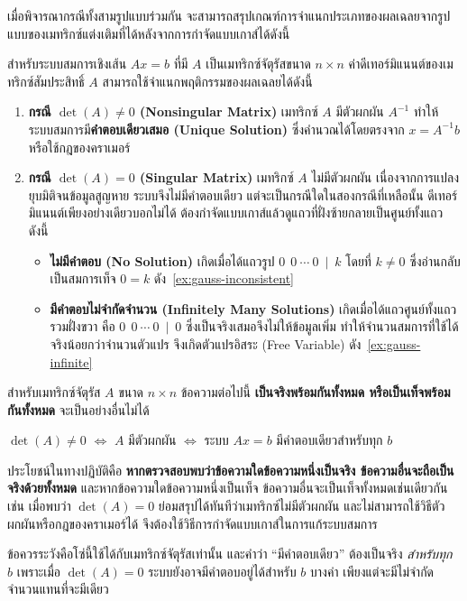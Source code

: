 เมื่อพิจารณากรณีทั้งสามรูปแบบร่วมกัน จะสามารถสรุปเกณฑ์การจำแนกประเภทของผลเฉลยจากรูปแบบของเมทริกซ์แต่งเติมที่ได้หลังจากการกำจัดแบบเกาส์ได้ดังนี้~\parencite{strang2023linear}

\begin{prop}
\label{prop:linear-system-solutions}
สำหรับระบบสมการเชิงเส้น $Ax = b$ ที่มี $A$ เป็นเมทริกซ์จัตุรัสขนาด $n \times n$ ค่าดีเทอร์มิแนนต์ของเมทริกซ์สัมประสิทธิ์ $A$ สามารถใช้จำแนกพฤติกรรมของผลเฉลยได้ดังนี้
\begin{enumerate}[label=\textbf{\arabic*.}]
    \item \textbf{กรณี $\det(A) \neq 0$ (Nonsingular Matrix)} เมทริกซ์ $A$ มีตัวผกผัน $A^{-1}$ ทำให้ระบบสมการมี\textbf{คำตอบเดียวเสมอ (Unique Solution)} ซึ่งคำนวณได้โดยตรงจาก $x = A^{-1}b$ หรือใช้กฎของคราเมอร์
    \item \textbf{กรณี $\det(A) = 0$ (Singular Matrix)} เมทริกซ์ $A$ ไม่มีตัวผกผัน เนื่องจากการแปลงยุบมิติจนข้อมูลสูญหาย ระบบจึงไม่มีคำตอบเดียว แต่จะเป็นกรณีใดในสองกรณีที่เหลือนั้น ดีเทอร์มิแนนต์เพียงอย่างเดียวบอกไม่ได้ ต้องกำจัดแบบเกาส์แล้วดูแถวที่ฝั่งซ้ายกลายเป็นศูนย์ทั้งแถว ดังนี้
    \begin{itemize}
        \item \textbf{ไม่มีคำตอบ (No Solution)} เกิดเมื่อได้แถวรูป $0\ \ 0\ \cdots\ 0\ \mid\ k$ โดยที่ $k \neq 0$ ซึ่งอ่านกลับเป็นสมการเท็จ $0 = k$ ดัง~\autoref{ex:gauss-inconsistent}
        \item \textbf{มีคำตอบไม่จำกัดจำนวน (Infinitely Many Solutions)} เกิดเมื่อได้แถวศูนย์ทั้งแถวรวมฝั่งขวา คือ $0\ \ 0\ \cdots\ 0\ \mid\ 0$ ซึ่งเป็นจริงเสมอจึงไม่ให้ข้อมูลเพิ่ม ทำให้จำนวนสมการที่ใช้ได้จริงน้อยกว่าจำนวนตัวแปร จึงเกิดตัวแปรอิสระ (Free Variable) ดัง~\autoref{ex:gauss-infinite}
    \end{itemize}
\end{enumerate}
\end{prop}

\begin{principle}
\label{prin:equivalence-chain}
สำหรับเมทริกซ์จัตุรัส $A$ ขนาด $n \times n$ ข้อความต่อไปนี้ \textbf{เป็นจริงพร้อมกันทั้งหมด หรือเป็นเท็จพร้อมกันทั้งหมด} จะเป็นอย่างอื่นไม่ได้

\begin{center}
$\det(A) \neq 0$ \quad $\Longleftrightarrow$ \quad $A$ มีตัวผกผัน \quad $\Longleftrightarrow$ \quad ระบบ $Ax = b$ มีคำตอบเดียวสำหรับทุก $b$
\end{center}

ประโยชน์ในทางปฏิบัติคือ \textbf{หากตรวจสอบพบว่าข้อความใดข้อความหนึ่งเป็นจริง ข้อความอื่นจะถือเป็นจริงด้วยทั้งหมด} และหากข้อความใดข้อความหนึ่งเป็นเท็จ ข้อความอื่นจะเป็นเท็จทั้งหมดเช่นเดียวกัน เช่น เมื่อพบว่า $\det(A) = 0$ ย่อมสรุปได้ทันทีว่าเมทริกซ์ไม่มีตัวผกผัน และไม่สามารถใช้วิธีตัวผกผันหรือกฎของคราเมอร์ได้ จึงต้องใช้วิธีการกำจัดแบบเกาส์ในการแก้ระบบสมการ

ข้อควรระวังคือโซ่นี้ใช้ได้กับเมทริกซ์จัตุรัสเท่านั้น และคำว่า ``มีคำตอบเดียว'' ต้องเป็นจริง \emph{สำหรับทุก $b$} เพราะเมื่อ $\det(A) = 0$ ระบบยังอาจมีคำตอบอยู่ได้สำหรับ $b$ บางค่า เพียงแต่จะมีไม่จำกัดจำนวนแทนที่จะมีเดียว
\end{principle}

